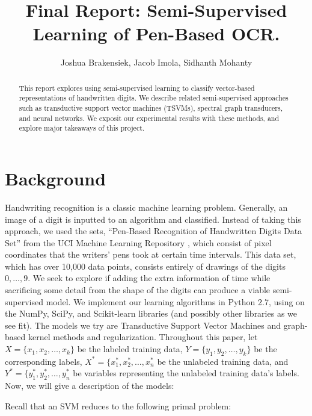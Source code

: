 \documentclass[11pt]{article}
\title{Final Report: Semi-Supervised Learning of Pen-Based OCR.}
\author{Joshua Brakensiek, Jacob Imola, Sidhanth Mohanty}
\begin{document}
\maketitle

\begin{abstract}

  This report explores using semi-supervised learning to classify vector-based representations of handwritten digits. We describe related semi-supervised approaches such as transductive support vector machines (TSVMs), spectral graph transducers, and neural networks. We exposit our experimental results with these methods, and explore major takeaways of this project.

\end{abstract}



\newcommand{\Seq}{\operatorname{Seq}}

\section{Background}

Handwriting recognition is a classic machine learning problem. Generally, an image of a digit is inputted to an algorithm and classified. Instead of taking this approach, we used the sets,  ``Pen-Based Recognition of Handwritten Digits Data Set'' \cite{Alpaydin:1998} from the UCI Machine Learning Repository \cite{Lichman:2013}, which consist of pixel coordinates that the writers' pens took at certain time intervals. This data set, which has over 10,000 data points, consists entirely of drawings of the digits $0, \hdots, 9$. We seek to explore if adding the extra information of time while sacrificing some detail from the shape of the digits can produce a viable semi-supervised model.  We implement our learning algorithms in Python 2.7, using on the NumPy, SciPy, and Scikit-learn libraries (and possibly other libraries as we see fit). The models we try are Transductive Support Vector Machines and graph-based kernel methods and regularization. Throughout this paper, let $X = \{x_1, x_2, \ldots, x_k\}$ be the labeled training data, $Y = \{y_1, y_2, \ldots, y_k\}$ be the corresponding labels, $X^* = \{x^*_1, x^*_2, \ldots, x^*_n$ be the unlabeled training data, and $Y^* = \{y^*_1, y^*_2, \ldots, y^*_n$ be variables representing the unlabeled training data's labels. Now, we will give a description of the models: \par

Recall that an SVM reduces to the following primal problem:
\end{document}
